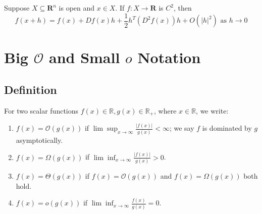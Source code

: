 \documentclass[11pt]{elegantbook}
\begin{document}
\begin{theorem}
    Suppose $X \subseteq \mathbf{R}^n$ is open and $x \in X$. If $f: X \rightarrow \mathbf{R}$ is $C^2$, then
    $$
    f(x+h)=f(x)+D f(x) h +\frac{1}{2}h^T(D^2f(x))h+O\left(|h|^2\right) \text { as } h \rightarrow 0
    $$
\end{theorem}



\chapter{Big $\mathcal{O}$ and Small $o$ Notation}
\section{Definition}
\begin{center}
\end{center}
For two scalar functions $f(x)\in \mathbb{R}, g(x)\in \mathbb{R}_+$, where $x\in \mathbb{R}$, we write:
\begin{enumerate}
    \item $f(x)=\mathcal{O}(g(x))$ if $\lim \sup_{x \rightarrow	\infty}\frac{|f(x)|}{g(x)}<\infty$; we say $f$ is dominated by $g$ asymptotically.
    \item $f(x)=\Omega(g(x))$ if $\lim \inf_{x \rightarrow \infty}\frac{|f(x)|}{g(x)}>0$.
    \item $f(x)=\Theta (g(x))$ if $f(x)=\mathcal{O}(g(x))$ and $f(x)=\Omega(g(x))$ both hold.
    \item $f(x)=o(g(x))$ if $\lim \inf_{x \rightarrow \infty}\frac{f(x)}{g(x)}=0$.
\end{enumerate}
\end{document}
